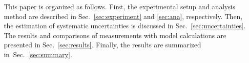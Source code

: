 This paper is organized as follows. First, the experimental setup and analysis method are described in Sec.~\ref{sec:experiment} and \ref{sec:ana}, respectively. Then, the estimation of systematic uncertainties is discussed in Sec.~\ref{sec:uncertainties}. The results and comparisons of measurements with model calculations are presented in Sec.~\ref{sec:results}. Finally, the results are summarized in~Sec.~\ref{sec:summary}.

 
